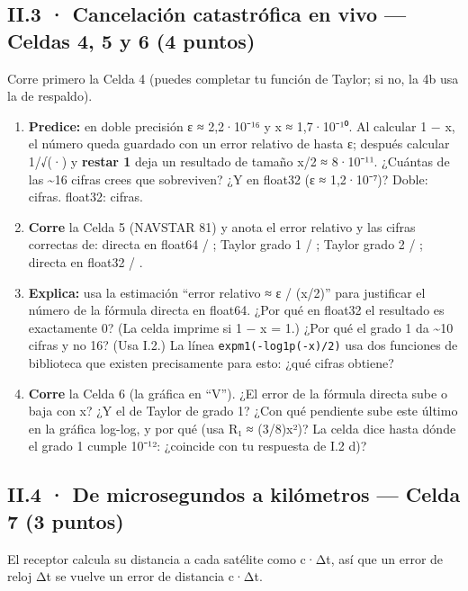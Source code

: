 \subsection{II.3 · Cancelación catastrófica en vivo --- Celdas 4, 5 y 6 (4 puntos)}

Corre primero la Celda 4 (puedes completar tu función de Taylor; si no, la 4b usa la de respaldo).

\begin{enumerate}
\def\labelenumi{\alph{enumi})}
\item
  \textbf{Predice:} en doble precisión ε ≈ 2,2·10⁻¹⁶ y x ≈ 1,7·10⁻¹⁰. Al calcular 1 − x, el número queda guardado con un error relativo de hasta ε; después calcular 1/√(·) y \textbf{restar 1} deja un resultado de tamaño x/2 ≈ 8·10⁻¹¹. ¿Cuántas de las \textasciitilde16 cifras crees que sobreviven? ¿Y en float32 (ε ≈ 1,2·10⁻⁷)?
  Doble:  cifras. float32:  cifras.
\item
  \textbf{Corre} la Celda 5 (NAVSTAR 81) y anota el error relativo y las cifras correctas de: directa en float64  /  ; Taylor grado 1  /  ; Taylor grado 2  /  ; directa en float32  /  .
\item
  \textbf{Explica:} usa la estimación ``error relativo ≈ ε / (x/2)'' para justificar el número de la fórmula directa en float64. ¿Por qué en float32 el resultado es exactamente 0? (La celda imprime si 1 − x = 1.) ¿Por qué el grado 1 da \textasciitilde10 cifras y no 16? (Usa I.2.) La línea \texttt{expm1(-log1p(-x)/2)} usa dos funciones de biblioteca que existen precisamente para esto: ¿qué cifras obtiene?
\item
  \textbf{Corre} la Celda 6 (la gráfica en ``V''). ¿El error de la fórmula directa sube o baja con x? ¿Y el de Taylor de grado 1? ¿Con qué pendiente sube este último en la gráfica log-log, y por qué (usa R₁ ≈ (3/8)x²)? La celda dice hasta dónde el grado 1 cumple 10⁻¹²: ¿coincide con tu respuesta de I.2 d)?
\end{enumerate}

\subsection{II.4 · De microsegundos a kilómetros --- Celda 7 (3 puntos)}

El receptor calcula su distancia a cada satélite como c·Δt, así que un error de reloj Δt se vuelve un error de distancia c·Δt.

